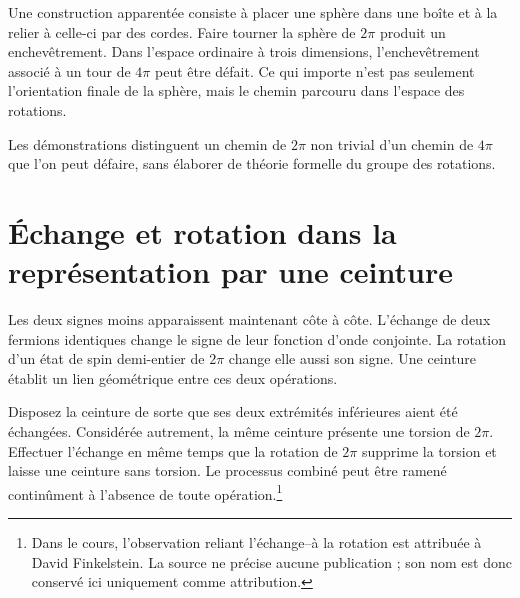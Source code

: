 Une construction apparentée consiste à placer une sphère dans une boîte et à la relier à celle-ci par des cordes. Faire tourner la sphère de \(2\pi\) produit un enchevêtrement. Dans l’espace ordinaire à trois dimensions, l’enchevêtrement associé à un tour de \(4\pi\) peut être défait. Ce qui importe n’est pas seulement l’orientation finale de la sphère, mais le chemin parcouru dans l’espace des rotations.

\begin{classroomqa}
\end{classroomqa}

Les démonstrations distinguent un chemin de \(2\pi\) non trivial d’un chemin de \(4\pi\) que l’on peut défaire, sans élaborer de théorie formelle du groupe des rotations.

\section{Échange et rotation dans la représentation par une ceinture}

Les deux signes moins apparaissent maintenant côte à côte. L’échange de deux fermions identiques change le signe de leur fonction d’onde conjointe. La rotation d’un état de spin demi-entier de \(2\pi\) change elle aussi son signe. Une ceinture établit un lien géométrique entre ces deux opérations.

Disposez la ceinture de sorte que ses deux extrémités inférieures aient été échangées. Considérée autrement, la même ceinture présente une torsion de \(2\pi\). Effectuer l’échange en même temps que la rotation de \(2\pi\) supprime la torsion et laisse une ceinture sans torsion. Le processus combiné peut être ramené continûment à l’absence de toute opération.\footnote{Dans le cours, l’observation reliant l’échange--à la rotation est attribuée à David Finkelstein. La source ne précise aucune publication ; son nom est donc conservé ici uniquement comme attribution.}

\begin{classroomqa}
\end{classroomqa}

